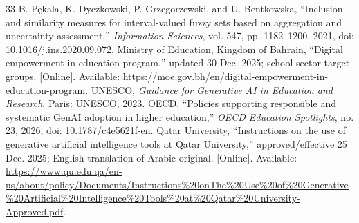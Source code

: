 \documentclass[conference,letterpaper]{IEEEtran}
\begin{document}
\begin{thebibliography}{33}
 B. P\k{e}kala, K. Dyczkowski, P. Grzegorzewski, and U. Bentkowska, ``Inclusion and similarity measures for interval-valued fuzzy sets based on aggregation and uncertainty assessment,'' \emph{Information Sciences}, vol. 547, pp. 1182--1200, 2021, doi: 10.1016/j.ins.2020.09.072.
 Ministry of Education, Kingdom of Bahrain, ``Digital empowerment in education program,'' updated 30 Dec. 2025; school-sector target groups. [Online]. Available: \url{https://moe.gov.bh/en/digital-empowerment-in-education-program}.
 UNESCO, \emph{Guidance for Generative AI in Education and Research}. Paris: UNESCO, 2023.
 OECD, ``Policies supporting responsible and systematic GenAI adoption in higher education,'' \emph{OECD Education Spotlights}, no. 23, 2026, doi: 10.1787/c4e5621f-en.
 Qatar University, ``Instructions on the use of generative artificial intelligence tools at Qatar University,'' approved/effective 25 Dec. 2025; English translation of Arabic original. [Online]. Available: \url{https://www.qu.edu.qa/en-us/about/policy/Documents/Instructions%20onThe%20Use%20of%20Generative%20Artificial%20Intelligence%20Tools%20at%20Qatar%20University-Approved.pdf}.


\end{thebibliography}
\end{document}
